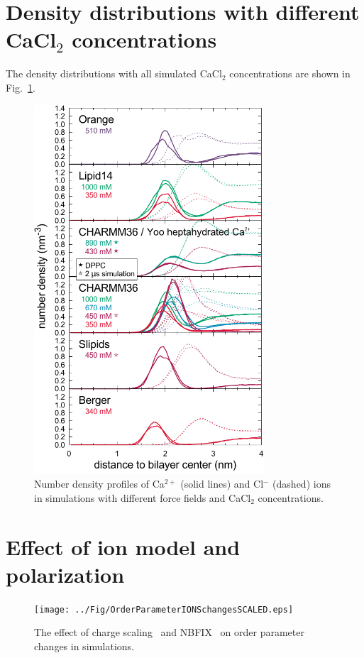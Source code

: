 \documentclass[twoside,twocolumn,9pt]{article}
\begin{document}
\section{Density distributions with different CaCl$_2$ concentrations}

The density distributions with all simulated CaCl$_2$ concentrations are shown in Fig.~\ref{CAdensities}.
\begin{figure}[t]
  \centering
  \includegraphics[width=8.6cm]{../Fig/CaDensities_allForSI.pdf}
  \caption{\label{CAdensities}
    Number density profiles of Ca$^{2+}$ (solid lines) and Cl$^-$ (dashed) ions in simulations with different force fields 
    and CaCl$_2$ concentrations. 
  }
\end{figure}

\section{Effect of ion model and polarization}

\begin{figure}[t]
  \centering
  \texttt{[image: ../Fig/OrderParameterIONSchangesSCALED.eps]} 
  \caption{\label{OPchangesSCALED}
    The effect of charge scaling~\cite{leontyev11,kohagen14} and NBFIX~\cite{venable13} on order parameter changes in simulations. 
    }
\end{figure}
\end{document}
